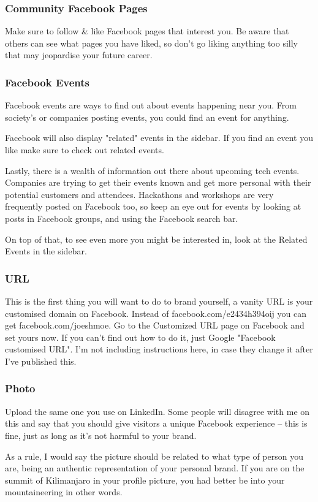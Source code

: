 \documentclass{article}
\begin{document}
\subsubsection{Community Facebook Pages}
Make sure to follow \& like Facebook pages that interest you. Be aware
that others can see what pages you have liked, so don't go liking
anything too silly that may jeopardise your future career.
\subsubsection{Facebook Events}
Facebook events are ways to find out about events happening near you.
From society's or companies posting events, you could find an event for
anything.

Facebook will also display "related" events in the sidebar. If you
find an event you like make sure to check out related events.

Lastly, there is a wealth of information out there about upcoming tech
events. Companies are trying to get their events known and get more
personal with their potential customers and attendees. Hackathons and
workshops are very frequently posted on Facebook too, so keep an eye out
for events by looking at posts in Facebook groups, and using the
Facebook search bar.

On top of that, to see even more you might be interested in, look at the
Related Events in the sidebar.
\subsubsection{URL}
This is the first thing you will want to do to brand yourself, a vanity
URL is your customised domain on Facebook. Instead of
facebook.com/e2434h394oij you can get facebook.com/joeshmoe. Go to the
Customized URL page on Facebook and set yours now. If you can't find out
how to do it, just Google "Facebook customised URL". I'm not including
instructions here, in case they change it after I've published this.
\subsubsection{Photo}
Upload the same one you use on LinkedIn. Some people will disagree with
me on this and say that you should give visitors a unique Facebook
experience -- this is fine, just as long as it's not harmful to your
brand.

As a rule, I would say the picture should be related to what type of
person you are, being an authentic representation of your personal
brand. If you are on the summit of Kilimanjaro in your profile picture,
you had better be into your mountaineering in other words.
\end{document}
